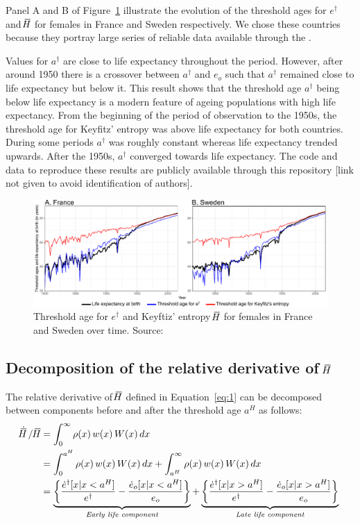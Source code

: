 \documentclass[a4paper,twoside, openright, 12pt, leqno]{article}
\newcommand*\xbar[1]{%
   \hbox{%
     \vbox{%
       \hrule height 0.5pt %
       \kern0.3ex%
       \hbox{%
         \kern-0.25em%
         \ensuremath{#1}%
         \kern-0.05em%
       }%
     }%
   }%
}
\begin{document}
Panel A and B of Figure~\ref{fig:Fig2} illustrate the evolution of the threshold ages for $e^\dagger$ and $\xbar{H}$ for females in France and Sweden respectively. We chose these countries because they portray large series of reliable data available through the \cite{HMD}. 

Values for $a^\dagger$ are close to life expectancy throughout the period. However, after around 1950 there is a crossover between $a^\dagger$ and $e_o$ such that $a^\dagger$ remained close to life expectancy but below it. This result shows that the threshold age $a^\dagger$ being below life expectancy is a modern feature of ageing populations with high life expectancy. From the beginning of the period of observation to the 1950s, the threshold age for Keyfitz' entropy was above life expectancy for both countries. During some periods $a^\dagger$ was roughly constant whereas life expectancy trended upwards. After the 1950s, $a^\dagger$ converged towards life expectancy. The code and data to reproduce these results are publicly available through this repository [link not given to avoid identification of authors].

\begin{figure}[h]
  \centering
  \includegraphics[scale=.72]{Threshold_ages}
  \caption{Threshold age for $e^\dagger$ and Keyftiz' entropy $\xbar{H}$ for females in France and Sweden over time. Source: \cite{HMD}}
  \label{fig:Fig2}
\end{figure}

\FloatBarrier

\subsection{Decomposition of the relative derivative of $\xbar{H}$}

The relative derivative of $\xbar{H}$ defined in Equation~\eqref{eq:1} can be decomposed between components before and after the threshold age $a^H$ as follows:
%
\begin{equation}
 \begin{split}
 \dot{\xbar{H}}\,/\,\xbar{H} &= \int_0^\infty\rho(x)\,w(x)\,W(x)\,dx\;\\
  & = \int_0^{a^H} \rho(x)\,w(x)\,W(x)\,dx + \int_{a^H}^\infty\rho(x)\,w(x)\,W(x)\,dx		 \\
		& = \underbrace{ \left\lbrace \frac{\dot{e}^\dagger[x|x < a^H]}{e^\dagger}- \frac{\dot{e}_o[x|x < a^H]}{e_o}  \right\rbrace }_{\textit{Early life component}} + \underbrace{\left\lbrace \frac{\dot{e}^\dagger[x|x > a^H]}{e^\dagger}-\frac{\dot{e}_o[x|x > a^H]}{e_o} \right\rbrace }_{\textit{Late life component}}
 \end{split}
 \label{Components2}
\end{equation}
\end{document}

